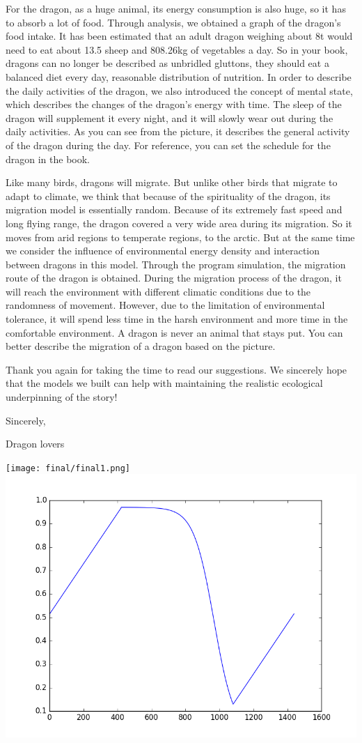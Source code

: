 \begin{memo}[Memorandum]
For the dragon, as a huge animal, its energy consumption is also huge, so it has to absorb a lot of food. Through analysis, we obtained a graph of the dragon's food intake. It has been estimated that an adult dragon weighing about 8t would need to eat about 13.5 sheep and 808.26kg of vegetables a day. So in your book, dragons can no longer be described as unbridled gluttons, they should eat a balanced diet every day, reasonable distribution of nutrition. In order to describe the daily activities of the dragon, we also introduced the concept of mental state, which describes the changes of the dragon's energy with time. The sleep of the dragon will supplement it every night, and it will slowly wear out during the daily activities. As you can see from the picture, it describes the general activity of the dragon during the day. For reference, you can set the schedule for the dragon in the book.

Like many birds, dragons will migrate. But unlike other birds that migrate to adapt to climate, we think that because of the spirituality of the dragon, its migration model is essentially random. Because of its extremely fast speed and long flying range, the dragon covered a very wide area during its migration. So it moves from arid regions to temperate regions, to the arctic. But at the same time we consider the influence of environmental energy density and interaction between dragons in this model. Through the program simulation, the migration route of the dragon is obtained. During the migration process of the dragon, it will reach the environment with different climatic conditions due to the randomness of movement. However, due to the limitation of environmental tolerance, it will spend less time in the harsh environment and more time in the comfortable environment. A dragon is never an animal that stays put. You can better describe the migration of a dragon based on the picture.

Thank you again for taking the time to read our suggestions. We sincerely hope that the models we built can help with maintaining the realistic ecological underpinning of the story!

\hfill Sincerely,

\hfill Dragon lovers

\begin{center}
\texttt{[image: final/final1.png]}
\includegraphics[width=.4\textwidth,height=.25\textwidth]{figures/attri/spirit.png}
\end{center}


\end{memo}
